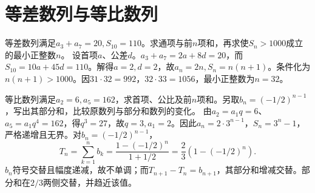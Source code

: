 \par\addvspace{12pt}

\section{等差数列与等比数列}

\label{sol:sec:analysis:2}

等差数列满足\(a_3+a_7=20,S_{10}=110\)。求通项与前\(n\)项和，再求使\(S_n>1000\)成立的最小正整数\(n\)。
\solutionanswer
设首项\(a\)、公差\(d\)。\(a_3+a_7=2a+8d=20\)，而\(S_{10}=10a+45d=110\)。解得\(a=2,d=2\)，故\(a_n=2n,S_n=n(n+1)\)。条件化为\(n(n+1)>1000\)。因\(31\cdot32=992\)，\(32\cdot33=1056\)，最小正整数为\(n=32\)。


等比数列满足\(a_2=6,a_5=162\)，求首项、公比及前\(n\)项和。另取\(b_n=(-1/2)^{n-1}\)，写出其部分和，比较原数列与部分和数列的变化。
\solutionanswer
由\(a_2=a_1q=6\)、\(a_5=a_1q^4=162\)，得\(q^3=27\)，故\(q=3,a_1=2\)。因此\(a_n=2\cdot3^{n-1}\)，\(S_n=3^n-1\)，严格递增且无界。对\(b_n=(-1/2)^{n-1}\)，
\[T_n=\sum_{k=1}^n b_k=\frac{1-(-1/2)^n}{1+1/2}=\frac23\left(1-(-1/2)^n\right).\]
\(b_n\)符号交替且幅度递减，故不单调；而\(T_{n+1}-T_n=b_{n+1}\)，其部分和增减交替。部分和在\(2/3\)两侧交替，并趋近该值。
\par
